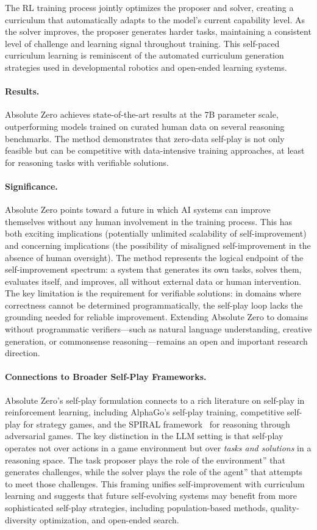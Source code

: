 The RL training process jointly optimizes the proposer and solver, creating a curriculum that automatically adapts to the model's current capability level. As the solver improves, the proposer generates harder tasks, maintaining a consistent level of challenge and learning signal throughout training. This self-paced curriculum learning is reminiscent of the automated curriculum generation strategies used in developmental robotics and open-ended learning systems.

\paragraph{Results.}
Absolute Zero achieves state-of-the-art results at the 7B parameter scale, outperforming models trained on curated human data on several reasoning benchmarks. The method demonstrates that zero-data self-play is not only feasible but can be competitive with data-intensive training approaches, at least for reasoning tasks with verifiable solutions.

\paragraph{Significance.}
Absolute Zero points toward a future in which AI systems can improve themselves without any human involvement in the training process. This has both exciting implications (potentially unlimited scalability of self-improvement) and concerning implications (the possibility of misaligned self-improvement in the absence of human oversight). The method represents the logical endpoint of the self-improvement spectrum: a system that generates its own tasks, solves them, evaluates itself, and improves, all without external data or human intervention. The key limitation is the requirement for verifiable solutions: in domains where correctness cannot be determined programmatically, the self-play loop lacks the grounding needed for reliable improvement. Extending Absolute Zero to domains without programmatic verifiers---such as natural language understanding, creative generation, or commonsense reasoning---remains an open and important research direction.

\paragraph{Connections to Broader Self-Play Frameworks.}
Absolute Zero's self-play formulation connects to a rich literature on self-play in reinforcement learning, including AlphaGo's self-play training, competitive self-play for strategy games, and the SPIRAL framework~\citep{liu2025spiralselfplay} for reasoning through adversarial games. The key distinction in the LLM setting is that self-play operates not over actions in a game environment but over \emph{tasks and solutions} in a reasoning space. The task proposer plays the role of the environment'' that generates challenges, while the solver plays the role of the agent'' that attempts to meet those challenges. This framing unifies self-improvement with curriculum learning and suggests that future self-evolving systems may benefit from more sophisticated self-play strategies, including population-based methods, quality-diversity optimization, and open-ended search.


